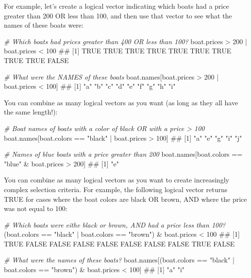 \documentclass[]{book}
\newenvironment{Shaded}{\begin{snugshade}}{\end{snugshade}}
\newcommand{\DecValTok}[1]{\textcolor[rgb]{0.00,0.00,0.81}{{#1}}}
\newcommand{\StringTok}[1]{\textcolor[rgb]{0.31,0.60,0.02}{{#1}}}
\newcommand{\CommentTok}[1]{\textcolor[rgb]{0.56,0.35,0.01}{\textit{{#1}}}}
\newcommand{\NormalTok}[1]{{#1}}
\theoremstyle{definition}
\theoremstyle{definition}
\theoremstyle{remark}
\begin{document}
For example, let's create a logical vector indicating which boats had a
price greater than 200 OR less than 100, and then use that vector to see
what the names of these boats were:

\begin{Shaded}
\begin{Highlighting}[]
\CommentTok{# Which boats had prices greater than 400 OR less than 100?}
\NormalTok{boat.prices >}\StringTok{ }\DecValTok{200} \NormalTok{|}\StringTok{ }\NormalTok{boat.prices <}\StringTok{ }\DecValTok{100}
\NormalTok{##  [1]  TRUE  TRUE  TRUE  TRUE  TRUE  TRUE  TRUE  TRUE  TRUE FALSE}

\CommentTok{# What were the NAMES of these boats}
\NormalTok{boat.names[boat.prices >}\StringTok{ }\DecValTok{200} \NormalTok{|}\StringTok{ }\NormalTok{boat.prices <}\StringTok{ }\DecValTok{100}\NormalTok{]}
\NormalTok{## [1] "a" "b" "c" "d" "e" "f" "g" "h" "i"}
\end{Highlighting}
\end{Shaded}

You can combine as many logical vectors as you want (as long as they all
have the same length!):

\begin{Shaded}
\begin{Highlighting}[]
\CommentTok{# Boat names of boats with a color of black OR with a price > 100}
\NormalTok{boat.names[boat.colors ==}\StringTok{ "black"} \NormalTok{|}\StringTok{ }\NormalTok{boat.prices >}\StringTok{ }\DecValTok{100}\NormalTok{]}
\NormalTok{## [1] "a" "e" "g" "i" "j"}

\CommentTok{# Names of blue boats with a price greater than 200}
\NormalTok{boat.names[boat.colors ==}\StringTok{ "blue"} \NormalTok{&}\StringTok{ }\NormalTok{boat.prices >}\StringTok{ }\DecValTok{200}\NormalTok{]}
\NormalTok{## [1] "e"}
\end{Highlighting}
\end{Shaded}

You can combine as many logical vectors as you want to create
increasingly complex selection criteria. For example, the following
logical vector returns TRUE for cases where the boat colors are black OR
brown, AND where the price was not equal to 100:

\begin{Shaded}
\begin{Highlighting}[]
\CommentTok{# Which boats were eithe black or brown, AND had a price less than 100?}
\NormalTok{(boat.colors ==}\StringTok{ "black"} \NormalTok{|}\StringTok{ }\NormalTok{boat.colors ==}\StringTok{ "brown"}\NormalTok{) &}\StringTok{ }\NormalTok{boat.prices <}\StringTok{ }\DecValTok{100}
\NormalTok{##  [1]  TRUE FALSE FALSE FALSE FALSE FALSE FALSE FALSE  TRUE FALSE}

\CommentTok{# What were the names of these boats?}
\NormalTok{boat.names[(boat.colors ==}\StringTok{ "black"} \NormalTok{|}\StringTok{ }\NormalTok{boat.colors ==}\StringTok{ "brown"}\NormalTok{) &}\StringTok{ }\NormalTok{boat.prices <}\StringTok{ }\DecValTok{100}\NormalTok{]}
\NormalTok{## [1] "a" "i"}
\end{Highlighting}
\end{Shaded}
\end{document}
